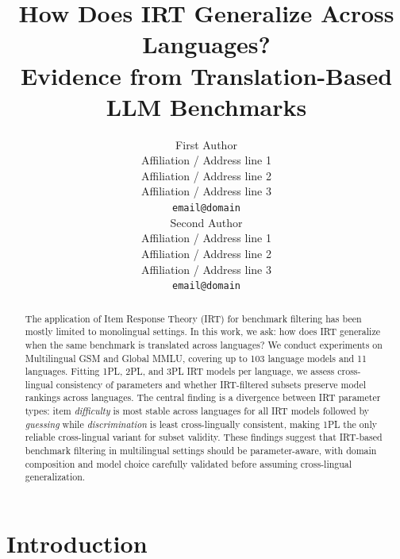 \documentclass[11pt]{article}
\title{How Does IRT Generalize Across Languages? \\Evidence from Translation-Based LLM Benchmarks}
\author{First Author \\
  Affiliation / Address line 1 \\
  Affiliation / Address line 2 \\
  Affiliation / Address line 3 \\
  \texttt{email@domain} \\\And
  Second Author \\
  Affiliation / Address line 1 \\
  Affiliation / Address line 2 \\
  Affiliation / Address line 3 \\
  \texttt{email@domain} \\}
\begin{document}
\maketitle

\begin{abstract}


The application of Item Response Theory (IRT) for benchmark filtering has been mostly limited to monolingual settings. In this work, we ask: how does IRT generalize when the same benchmark is translated across languages? We conduct experiments on Multilingual GSM and Global MMLU, covering up to 103 language models and 11 languages.  Fitting 1PL, 2PL, and 3PL IRT models per language, we assess cross-lingual consistency of parameters and whether IRT-filtered subsets preserve model rankings across languages. The central finding is a divergence between IRT parameter types: item \emph{difficulty} is most stable across languages for all IRT models followed by \emph{guessing} while \emph{discrimination} is least cross-lingually consistent, making 1PL the only reliable cross-lingual variant for subset validity.  These findings suggest that IRT-based benchmark filtering in multilingual settings should be parameter-aware, with domain composition and model choice carefully validated before assuming cross-lingual generalization.


\end{abstract}

\section{Introduction}
\end{document}
